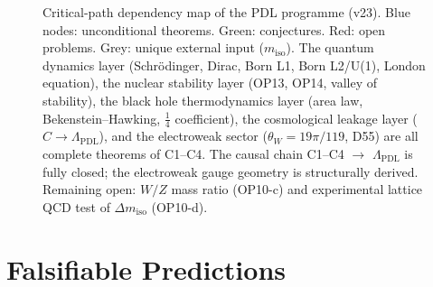 \documentclass[11pt,a4paper]{article}
\theoremstyle{plain}
\theoremstyle{definition}
\theoremstyle{remark}
\begin{document}
\begin{figure}[H]
{\begin{tikzpicture}
\end{tikzpicture}%
}
\caption{Critical-path dependency map of the PDL programme (v23). \textcolor{proofblue}{Blue nodes}: unconditional theorems. \textcolor{conjecturegreen}{Green}: conjectures. \textcolor{openproblemred}{Red}: open problems. Grey: unique external input ($m_{\mathrm{iso}}$). The quantum dynamics layer (Schr\"odinger, Dirac, Born L1, Born L2/U(1), London equation), the nuclear stability layer (OP13, OP14, valley of stability), the black hole thermodynamics layer (area law, Bekenstein--Hawking, $\tfrac{1}{4}$ coefficient), the cosmological leakage layer ($C \to \Lambda_{\mathrm{PDL}}$), and the electroweak sector ($\theta_W = 19\pi/119$, D55) are all complete theorems of C1--C4. The causal chain C1--C4 $\to$ $\Lambda_{\mathrm{PDL}}$ is fully closed; the electroweak gauge geometry is structurally derived. Remaining open: $W/Z$ mass ratio (OP10-c) and experimental lattice QCD test of $\Delta m_{\mathrm{iso}}$ (OP10-d).}
\label{fig:dependency}
\end{figure}

\newpage

\section{Falsifiable Predictions}
\label{sec:predictions}
\end{document}
